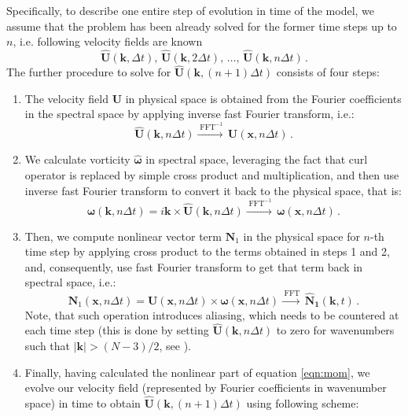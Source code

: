 \documentclass{pracamgren}
\begin{document}
Specifically, to describe one entire step of evolution in time of the model, we assume that the problem has been already solved for the former time steps up to $n$, i.e.  following velocity fields are known
$$ \mathbf{\hat{U}}(\mathbf{k}, \Delta t) , \, \mathbf{\hat{U}}(\mathbf{k}, 2 \Delta t) , \, \ldots , \, \mathbf{\hat{U}}(\mathbf{k}, n \Delta t) \, .  $$
The further procedure to solve for $\mathbf{\hat{U}}(\mathbf{k}, (n+1) \Delta t)$ consists of four steps:
\begin{enumerate}
\item The velocity field $\mathbf{U}$ in physical space is obtained from the Fourier coefficients in the spectral space by applying inverse fast Fourier transform, i.e.:
\begin{equation}
\mathbf{\hat{U}}(\mathbf{k}, n \Delta t) \xrightarrow{\; \text{FFT}^{-1}} \, \mathbf{U}(\mathbf{x}, n \Delta t) \, .
\label{eqn:psproc-1}
\end{equation}
\item We calculate vorticity $\boldsymbol{\hat{\omega}}$ in spectral space, leveraging the fact that curl operator is replaced by simple cross product and multiplication, and then use inverse fast Fourier transform to convert it back to the physical space, that is:
\begin{equation}
\boldsymbol{\hat{\omega}}(\mathbf{k}, n \Delta t) = i \mathbf{k} \times \mathbf{\hat{U}}(\mathbf{k}, n \Delta t) \xrightarrow{\; \text{FFT}^{-1}} \, \boldsymbol{\omega}(\mathbf{x}, n \Delta t) \, .
\label{eqn:psproc-2}
\end{equation}
\item Then, we compute nonlinear vector term $\mathbf{N}_1$ in the physical space for $n$-th time step by applying cross product to the terms obtained in steps 1 and 2, and, consequently, use fast Fourier transform to get that term back in spectral space, i.e.:
\begin{equation}
\mathbf{N}_1(\mathbf{x}, n \Delta t) = \mathbf{U}(\mathbf{x}, n \Delta t) \times \boldsymbol{\omega}(\mathbf{x}, n \Delta t) \xrightarrow{\; \text{FFT}} \, \mathbf{\hat{N}_1}(\mathbf{k}, t) \, .
\label{eqn:psproc-3}
\end{equation}
Note, that such operation introduces aliasing, which needs to be countered at each time step (this is done by setting $\mathbf{\hat{U}}(\mathbf{k}, n \Delta t)$ to zero for wavenumbers such that ${|\mathbf{k}| > (N - 3) / 2}$, see \textcite{Rosa2015}).
\item Finally, having calculated the nonlinear part of equation \ref{eqn:mom}, we evolve our velocity field (represented by Fourier coefficients in wavenumber space) in time to obtain ${\mathbf{\hat{U}}(\mathbf{k}, (n+1) \Delta t)}$ using following scheme:

\end{enumerate}
\end{document}
